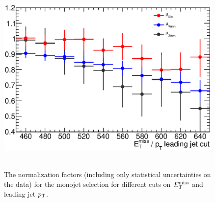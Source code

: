 \begin{figure}[!ht]
  \begin{center}
    \mbox{
      \includegraphics[width=0.995\textwidth]{Appendix_FluctuationM6/Figures/scaleFactorsPlot.eps}
    }
  \end{center}
  \caption{The normalization factors (including only statistical uncertainties on the data) for the monojet selection for different cuts on $E_{\mathrm{T}}^{\mathrm{miss}}$ and leading jet $p_{\mathrm{T}}$.}
  \label{fig:FluctuationM6scaleFactors}
\end{figure}


